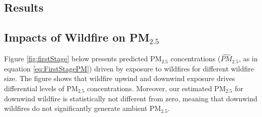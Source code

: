 \documentclass[11pt]{article}
\begin{document}
\begin{spacing}{1.3}





\section{Results}
\label{scn:results}

\subsection{Impacts of Wildfire on PM$_{2.5}$}
\label{sscn:results_pm25}
Figure \ref{fig:firstStage} below presents predicted PM$_{2.5}$ concentrations ($\widehat{PM}_{2.5}$, as in equation \ref{eq:FirstStagePM}) driven by exposure to wildfires for different wildfire size. The figure shows that wildfire upwind and downwind exposure drives differential levels of PM$_{2.5}$ concentrations. Moreover, our estimated PM$_{2.5}$ for downwind wildfire is statistically not different from zero, meaning that downwind wildfires do not significantly generate ambient PM$_{2.5}$.  


\end{spacing}
\end{document}
